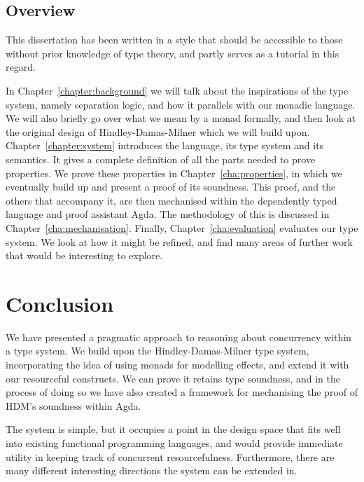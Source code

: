 \documentclass{report}
\begin{document}
\section{Overview}

This dissertation has been written in a style that should be accessible to those
without prior knowledge of type theory, and partly serves as a tutorial in this
regard.

In Chapter~\ref{chapter:background} we will talk about the inspirations of the
type system, namely separation logic, and how it parallels with our monadic
language. We will also briefly go over what we mean by a monad formally, and
then look at the original design of Hindley-Damas-Milner which we will build
upon.
Chapter~\ref{chapter:system} introduces the language, its type system and its
semantics.  It gives a complete definition of all the parts needed to prove
properties.  We prove these properties in Chapter~\ref{cha:properties}, in which
we eventually build up and present a proof of its soundness. This proof, and the
others that accompany it, are then mechanised within the dependently typed
language and proof assistant Agda. The methodology of this is discussed in
Chapter~\ref{cha:mechanisation}. Finally, Chapter~\ref{cha:evaluation}
evaluates our type system. We look at how it might be refined, and find many
areas of further work that would be interesting to explore.











\chapter{Conclusion}
We have presented a pragmatic approach to reasoning about concurrency within a
type system. We build upon the Hindley-Damas-Milner type system, incorporating
the idea of using monads for modelling effects, and extend it with our
resourceful constructs. We can prove it retains type soundness, and in the
process of doing so we have also created a framework for mechanising the proof
of HDM's soundness within Agda.

The system is simple, but it occupies a point in the design space that fits well
into existing functional programming languages, and would provide immediate
utility in keeping track of concurrent resourcefulness. Furthermore, there are
many different interesting directions the system can be extended in.





\end{document}
